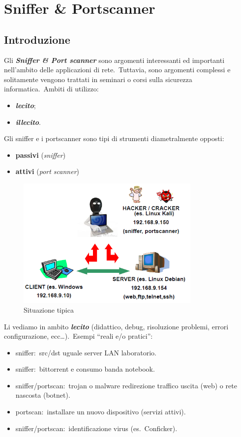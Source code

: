 \chapter{Sniffer \& Portscanner}

\section{Introduzione}

Gli \textbf{\emph{Sniffer \& Port scanner}} sono argomenti interessanti ed importanti nell'ambito delle applicazioni di rete.\
Tuttavia, sono argomenti complessi e solitamente vengono trattati in seminari o corsi sulla sicurezza informatica.\
Ambiti di utilizzo:

\begin{itemize}
    \item \textbf{\emph{lecito}};
    \item \textbf{\emph{illecito}}.
\end{itemize}
Gli sniffer e i portscanner sono tipi di strumenti diametralmente opposti:
\begin{itemize}
    \item \textbf{passivi} (\emph{sniffer})
    \item \textbf{attivi} (\emph{port scanner})
\end{itemize}
\begin{figure}[H]
    \centering
    \includegraphics[width=0.8\textwidth]{immagini/Sniffer&portscanner.png}
    \caption*{Situazione tipica}
\end{figure}
Li vediamo in ambito \textbf{\emph{lecito}} (didattico, debug, risoluzione problemi, errori configurazione, ecc\dots).\
Esempi ``reali e/o pratici'':

\begin{itemize}
    \item sniffer:\ src/dst uguale server LAN laboratorio.
    \item sniffer:\ bittorrent e consumo banda notebook.
    \item sniffer/portscan:\ trojan o malware redirezione traffico uscita (web) o rete nascosta (botnet).
    \item portscan:\ installare un nuovo dispositivo (servizi attivi).
    \item sniffer/portscan:\ identificazione virus (es.\
          Conficker).
\end{itemize}

